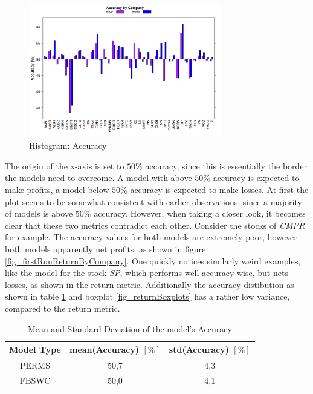 \begin{figure}[h]
	\centering
  	\includegraphics[width=0.75\textwidth]{accuracyByCompany}
	\caption{Histogram: Accuracy }
	\label{fig_accuracyByCompany}
\end{figure}

The origin of the x-axis is set to $50\%$ accuracy, since this is essentially the border the models need to overcome. A model with above $50\%$ accuracy is expected to make profits, a model below $50\%$ accuracy is expected to make losses. At first the plot seems to be somewhat consistent with earlier observations, since a majority of models is above $50\%$ accuracy. However, when taking a closer look, it becomes clear that these two metrics contradict each other. Consider the stocks of \textit{CMPR} for example. The accuracy values for both models are extremely poor, however both models apparently net profits, as shown in figure \ref{fig_firstRunReturnByCompany}. One quickly notices similarly weird examples, like the model for the stock \textit{SP}, which performs well accuracy-wise, but nets losses, as shown in the return metric. Additionally the accuracy distibution as shown in table \ref{table_firstRunAccuracy} and boxplot \ref{fig_returnBoxplots} has a rather low variance, compared to the return metric.

\begin{table}	
\caption{Mean and Standard Deviation of the model's Accuracy\label{table_firstRunAccuracy}}
\begin{tabular}{ c | c | c}		
  Model Type & mean(Accuracy) $[\%]$ & std(Accuracy) $[\%]$\\
  \hline
  PERMS & 50,7 & 4,3\\
  FBSWC & 50,0 & 4,1\\
\end{tabular}
\end{table}

